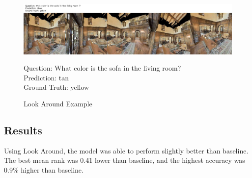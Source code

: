 \begin{figure}[h]
	\centering
	\includegraphics[width=\textwidth]{./figure/lookaroundexample.jpg}
	\captionsetup{justification=raggedright, textfont=footnotesize}
	\caption*{Question: What color is the sofa in the living room? \\
	Prediction: tan \\
	Ground Truth: yellow}
    \captionsetup{labelfont=bf, textfont=normal,
			justification=centering,
			singlelinecheck=false}
	\caption{Look Around Example}
	\label{fig:look_around}
\end{figure}


\subsection{Results}
Using Look Around, the model was able to perform slightly better than baseline. The best mean rank was 0.41 lower than baseline, and the highest accuracy was 0.9\% higher than baseline. 

